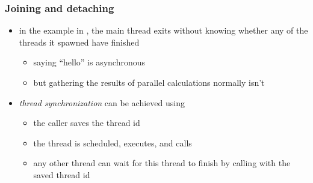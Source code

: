 \begin{frame}[fragile]
%
  \frametitle{Joining and detaching}
%
  \begin{itemize}
%
  \item in the example in , the main thread exits without knowing whether
    any of the threads it spawned have finished
    \begin{itemize}
    \item saying ``hello'' is asynchronous
    \item but gathering the results of parallel calculations normally isn't
    \end{itemize}
%
  \item {\em thread synchronization} can be achieved using 
    \begin{itemize}
      \item the  caller saves the thread id
      \item the thread is scheduled, executes, and calls 
      \item any other thread can wait for this thread to finish by calling
         with the saved thread id
    \end{itemize}
%
  \end{itemize}
%
\end{frame}

